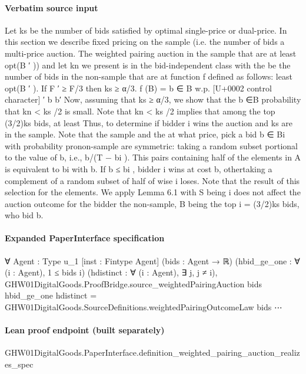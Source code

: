 \documentclass[10pt]{article}
\begin{document}
\paragraph{Verbatim source input}
\begin{ReviewVerbatim}
Let ks be the number of bids satisfied by optimal single-price or dual-price. In this section we describe
fixed pricing on the sample (i.e. the number of bids a multi-price auction. The weighted pairing auction
in the sample that are at least opt(B ′ )) and let kn we present is in the bid-independent class with the
be the number of bids in the non-sample that are at function f defined as follows:
least opt(B ′ ). If F ′ ≥ F/3 then ks ≥ α/3.
f (B) = b ∈ B w.p. [U+0002 control character] ′ b b′
Now, assuming that ks ≥ α/3, we show that the
b ∈B
probability that kn < ks /2 is small. Note that kn <
ks /2 implies that among the top (3/2)ks bids, at least Thus, to determine if bidder i wins the auction and
ks are in the sample. Note that the sample and the at what price, pick a bid b ∈ Bi with probability pronon-sample are symmetric: taking a random subset portional to the value of b, i.e., b/(T − bi ). This pairs
containing half of the elements in A is equivalent to bi with b. If b ≤ bi , bidder i wins at cost b, othertaking a complement of a random subset of half of wise i loses. Note that the result of this selection for
the elements. We apply Lemma 6.1 with S being i does not affect the auction outcome for the bidder
the non-sample, B being the top i = (3/2)ks bids, who bid b.
\end{ReviewVerbatim}


\paragraph{Expanded PaperInterface specification}
\begin{ReviewVerbatim}
∀ {Agent : Type u_1} [inst : Fintype Agent] (bids : Agent → ℝ) (hbid_ge_one : ∀ (i : Agent), 1 ≤ bids i)
  (hdistinct : ∀ (i : Agent), ∃ j, j ≠ i),
  GHW01DigitalGoods.ProofBridge.source_weightedPairingAuction bids hbid_ge_one hdistinct =
    GHW01DigitalGoods.SourceDefinitions.weightedPairingOutcomeLaw bids ⋯
\end{ReviewVerbatim}

\paragraph{Lean proof endpoint (built separately)}\begin{ReviewVerbatim}
GHW01DigitalGoods.PaperInterface.definition_weighted_pairing_auction_realizes_spec
\end{ReviewVerbatim}
\end{document}
